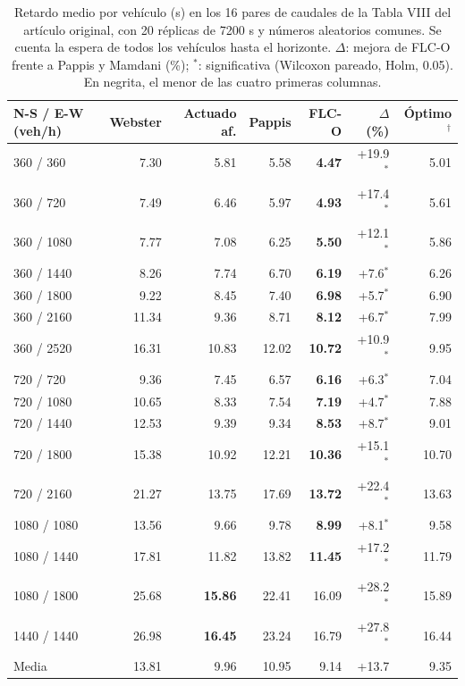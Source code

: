 \begin{table}[t]
\centering
\caption{Retardo medio por veh\'iculo (s) en los 16 pares de caudales de la Tabla VIII del art\'iculo original, con 20 r\'eplicas de 7200 s y n\'umeros aleatorios comunes. Se cuenta la espera de todos los veh\'iculos hasta el horizonte. $\Delta$: mejora de FLC-O frente a Pappis y Mamdani (\%); $^{*}$: significativa (Wilcoxon pareado, Holm, 0.05). En negrita, el menor de las cuatro primeras columnas.}
\label{tab:oficial}
\scriptsize
\setlength{\tabcolsep}{2.6pt}
\begin{tabular}{@{}lrrrrrr@{}}
\toprule
N-S / E-W (veh/h) & Webster & Actuado af. & Pappis & FLC-O & $\Delta$ (\%) & \'Optimo$^{\dagger}$ \\
\midrule
360 / 360 & 7.30 & 5.81 & 5.58 & \textbf{4.47} & +19.9$^{*}$ & 5.01 \\
360 / 720 & 7.49 & 6.46 & 5.97 & \textbf{4.93} & +17.4$^{*}$ & 5.61 \\
360 / 1080 & 7.77 & 7.08 & 6.25 & \textbf{5.50} & +12.1$^{*}$ & 5.86 \\
360 / 1440 & 8.26 & 7.74 & 6.70 & \textbf{6.19} & +7.6$^{*}$ & 6.26 \\
360 / 1800 & 9.22 & 8.45 & 7.40 & \textbf{6.98} & +5.7$^{*}$ & 6.90 \\
360 / 2160 & 11.34 & 9.36 & 8.71 & \textbf{8.12} & +6.7$^{*}$ & 7.99 \\
360 / 2520 & 16.31 & 10.83 & 12.02 & \textbf{10.72} & +10.9$^{*}$ & 9.95 \\
720 / 720 & 9.36 & 7.45 & 6.57 & \textbf{6.16} & +6.3$^{*}$ & 7.04 \\
720 / 1080 & 10.65 & 8.33 & 7.54 & \textbf{7.19} & +4.7$^{*}$ & 7.88 \\
720 / 1440 & 12.53 & 9.39 & 9.34 & \textbf{8.53} & +8.7$^{*}$ & 9.01 \\
720 / 1800 & 15.38 & 10.92 & 12.21 & \textbf{10.36} & +15.1$^{*}$ & 10.70 \\
720 / 2160 & 21.27 & 13.75 & 17.69 & \textbf{13.72} & +22.4$^{*}$ & 13.63 \\
1080 / 1080 & 13.56 & 9.66 & 9.78 & \textbf{8.99} & +8.1$^{*}$ & 9.58 \\
1080 / 1440 & 17.81 & 11.82 & 13.82 & \textbf{11.45} & +17.2$^{*}$ & 11.79 \\
1080 / 1800 & 25.68 & \textbf{15.86} & 22.41 & 16.09 & +28.2$^{*}$ & 15.89 \\
1440 / 1440 & 26.98 & \textbf{16.45} & 23.24 & 16.79 & +27.8$^{*}$ & 16.44 \\
\midrule
Media & 13.81 & 9.96 & 10.95 & 9.14 & +13.7 & 9.35 \\
\bottomrule
\end{tabular}
\end{table}
